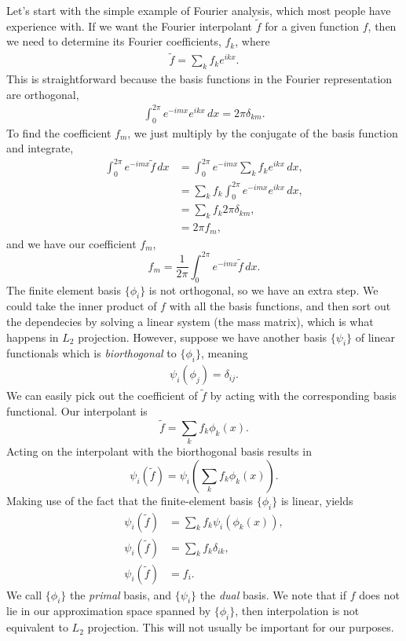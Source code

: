 Let's start with the simple example of 
Fourier analysis, which most people have experience with. If we want
the Fourier interpolant $\tilde f$ for a given function $f$, then we
need to determine its Fourier coefficients, $f_k$, where
\begin{align}
  \tilde f = \sum_k f_k e^{i k x}.
\end{align}
This is straightforward because the basis functions in the Fourier
representation are orthogonal,
\begin{align}
  \int^{2\pi}_0 e^{-i m x} e^{i k x} \, dx = 2\pi \delta_{km}.
\end{align}
To find the coefficient $f_m$, we just multiply by the conjugate of
the basis function and integrate,
\begin{align}
  \int^{2\pi}_0 e^{-i m x} \tilde f \, dx &= \int^{2\pi}_0 e^{-i m x} \sum_k f_k e^{i k x} \, dx, \\
                                  &= \sum_k f_k \int^{2\pi}_0 e^{-i m x} e^{i k x} \, dx, \\
                                  &= \sum_k f_k 2\pi \delta_{km}, \\
  &= 2\pi f_m,
\end{align}
and we have our coefficient $f_m$,
\begin{equation}
  f_m = \frac{1}{2 \pi}\int^{2\pi}_0 e^{-i m x} \tilde f \, dx.
\end{equation}
The finite element basis $\{\phi_i\}$ is not orthogonal, so we have an
extra step. We could take the inner product of $f$ with all the basis
functions, and then sort out the dependecies by solving a linear
system (the mass matrix), which is what happens in $L_2$
projection. However, suppose we have another basis $\{\psi_i\}$ of
linear functionals which is \textit{biorthogonal} to $\{\phi_i\}$,
meaning
\begin{align}
  \psi_i(\phi_j) = \delta_{ij}.
\end{align}
We can easily pick out the coefficient of $\tilde f$ by acting
with the corresponding basis functional. Our interpolant is
\begin{equation}
  \tilde f = \sum_k f_k \phi_k(x).
\end{equation}
Acting on the interpolant with the biorthogonal basis results in
\begin{equation}
  \psi_i(\tilde f) = \psi_i\left( \sum_k f_k \phi_k(x) \right).
\end{equation}
Making use of the fact that the finite-element basis $\{\phi_i\}$ is linear, yields
\begin{align}
  \psi_i(\tilde f) &= \sum_k f_k \psi_i\left( \phi_k(x) \right),\\
  \psi_i(\tilde f) &= \sum_k f_k \delta_{ik}, \\
  \psi_i(\tilde f) &= f_i.
\end{align}
We call $\{\phi_i\}$ the \textit{primal} basis, and $\{\psi_i\}$ the
\textit{dual} basis. We note that if $f$ does not lie in our
approximation space spanned by $\{\phi_i\}$, then interpolation is not
equivalent to $L_2$ projection. This will not usually be important for
our purposes.

